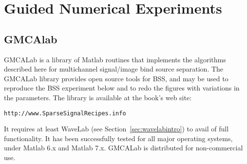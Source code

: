 
 

\section{Guided Numerical Experiments}
\subsection{GMCAlab}
\label{sec:gmcalab}
GMCALab is a library of Matlab routines that implements the algorithms described here for multichannel signal/image bind source separation. The GMCALab library provides open source tools for BSS, and may be used to reproduce the BSS experiment below and to redo the figures with variations in the parameters. The library is available at the book's web site: 

{\centerline{\texttt{http://www.SparseSignalRecipes.info}}}

It requires at least WaveLab (see Section~\ref{sec:wavelabintro}) to avail of
full functionality. It has been successfully tested for all major 
operating systems, under Matlab 6.x and Matlab 7.x. 
GMCALab is distributed for non-commercial use. 

